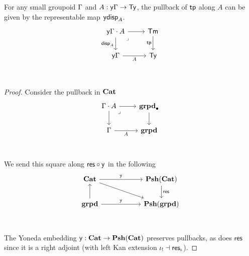 \begin{cor}
  For any small groupoid $\Gamma$ and $A : \mathsf{y} \Gamma \to \mathsf{Ty}$,
  the pullback of $\mathsf{tp}$ along $A$ can be given by the representable
  map $\mathsf{y} \mathsf{disp}_{A}$.
  \[\begin{tikzcd}
    {\yo \Ga \cdot A} & \Term \\
    {\yo \Ga} & \Type \\
    {}
    \arrow[from=1-1, to=1-2]
    \arrow["{\disp A}"', from=1-1, to=2-1]
    \arrow["\lrcorner"{anchor=center, pos=0.125}, draw=none, from=1-1, to=2-2]
    \arrow["\tp"', from=1-2, to=2-2]
    \arrow["A"', from=2-1, to=2-2]
  \end{tikzcd}\]
\end{cor}
\begin{proof}
  Consider the pullback in $\mathbf{Cat}$
  \[\begin{tikzcd}
    {\Ga \cdot A} & \ptgrpd \\
    \Ga & \grpd \\
    {}
    \arrow[from=1-1, to=1-2]
    \arrow[from=1-1, to=2-1]
    \arrow["\lrcorner"{anchor=center, pos=0.125}, draw=none, from=1-1, to=2-2]
    \arrow[from=1-2, to=2-2]
    \arrow["A"', from=2-1, to=2-2]
  \end{tikzcd}\]
  We send this square along $\textsf{res} \circ \mathsf{y}$ in the following
  \[\begin{tikzcd}
    \Cat && \PshCat \\
    \grpd && \Pshgrpd \\
    & {}
    \arrow["\yo", from=1-1, to=1-3]
    \arrow[from=1-1, to=2-3]
    \arrow["{\textsf{res}}", from=1-3, to=2-3]
    \arrow[from=2-1, to=1-1]
    \arrow["\yo", from=2-1, to=2-3]
  \end{tikzcd}\]
  The Yoneda embedding $\mathsf{y} : \mathbf{Cat} \to \mathbf{Psh}(\mathbf{Cat})$ preserves pullbacks,
  as does $\textsf{res}$ since it is a right adjoint
  (with left Kan extension $\iota_{!} \dashv \textsf{res}_{\iota}$).
\end{proof}

